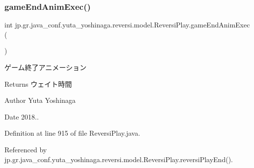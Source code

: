 \subsubsection{\texorpdfstring{game\+End\+Anim\+Exec()}{gameEndAnimExec()}}
{\footnotesize\ttfamily int jp.\+gr.\+java\+\_\+conf.\+yuta\+\_\+yoshinaga.\+reversi.\+model.\+Reversi\+Play.\+game\+End\+Anim\+Exec (\begin{DoxyParamCaption}{ }\end{DoxyParamCaption})}



ゲーム終了アニメーション 

\begin{DoxyReturn}{Returns}
ウェイト時間 
\end{DoxyReturn}
\begin{DoxyAuthor}{Author}
Yuta Yoshinaga 
\end{DoxyAuthor}
\begin{DoxyDate}{Date}
2018.. 
\end{DoxyDate}


Definition at line 915 of file Reversi\+Play.\+java.



Referenced by jp.\+gr.\+java\+\_\+conf.\+yuta\+\_\+yoshinaga.\+reversi.\+model.\+Reversi\+Play.\+reversi\+Play\+End().

